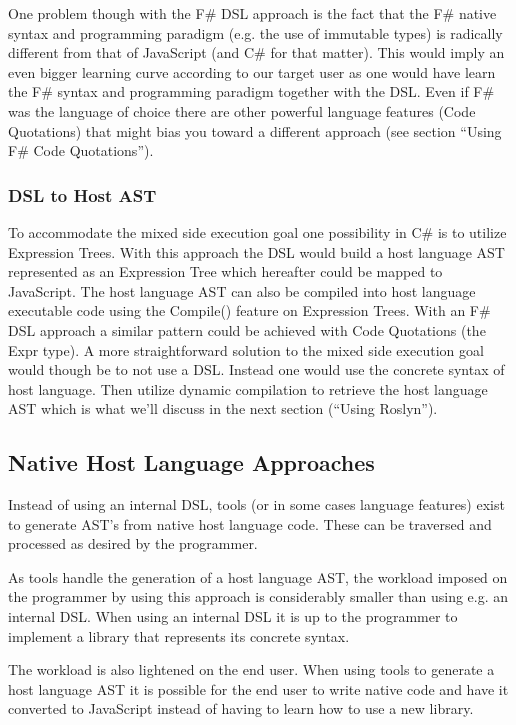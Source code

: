 			One problem though with the F\# DSL approach is the fact that the F\# native syntax and programming paradigm (e.g. the use of immutable types) is radically different from that of JavaScript (and C\# for that matter). This would imply an even bigger learning curve according to our target user as one would have learn the F\# syntax and programming paradigm together with the DSL. Even if F\# was the language of choice there are other powerful language features (Code Quotations) that might bias you toward a different approach (see section “Using F\# Code Quotations”).

		\subsubsection{DSL to Host AST}
			To accommodate the mixed side execution goal one possibility in C\# is to utilize Expression Trees. With this approach the DSL would build a host language AST represented as an Expression Tree which hereafter could be mapped to JavaScript. The host language AST can also be compiled into host language executable code using the Compile() feature on Expression Trees. With an F\# DSL approach a similar pattern could be achieved with Code Quotations (the Expr type). A more straightforward solution to the mixed side execution goal would though be to not use a DSL. Instead one would use the concrete syntax of host language. Then utilize dynamic compilation to retrieve the host language AST which is what we’ll discuss in the next section (“Using Roslyn”).

	\subsection{Native Host Language Approaches} %
		\label{sub:native_host_language_approaches}
		Instead of using an internal DSL, tools (or in some cases language features) exist to generate AST’s from native host language code. These can be traversed and processed as desired by the programmer.

		As tools handle the generation of a host language AST, the workload imposed on the programmer by using this approach is considerably smaller than using e.g. an internal DSL. When using an internal DSL it is up to the programmer to implement a library that represents its concrete syntax.

		The workload is also lightened on the end user. When using tools to generate a host language AST it is possible for the end user to write native code and have it converted to JavaScript instead of having to learn how to use a new library.

